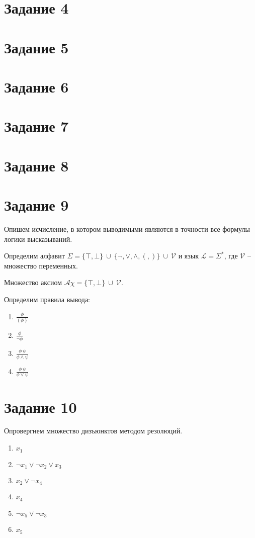 \documentclass{article}
\begin{document}
\section*{Задание 4}

\section*{Задание 5}

\section*{Задание 6}

\section*{Задание 7}

\section*{Задание 8}

\section*{Задание 9}
Опишем исчисление, в котором выводимыми являются в точности все формулы логики
высказываний.

Определим алфавит 
\(\Sigma = \{\top, \bot\}\ \cup\ \{\neg, \lor, \land, (, )\}\ \cup\ \mathcal{V}\)
и язык
\(\mathcal{L} = \Sigma^*\), где \(\mathcal{V}\) -- множество переменных.

Множество аксиом \(\mathcal{A\chi} = \{\top, \bot\}\ \cup\ \mathcal{V}\).

Определим правила вывода:
\begin{enumerate}
    \item \(\frac{\phi}{(\phi)}\)
    \item \(\frac{\phi}{\neg \phi}\)
    \item \(\frac{\phi \ \psi}{\phi \land \psi}\)
    \item \(\frac{\phi \ \psi}{\phi \lor \psi}\)
\end{enumerate}

\section*{Задание 10}
Опровергнем множество дизъюнктов методом резолюций.
\begin{enumerate}
    \item \(x_1\)
    \item \(\neg x_1 \lor \neg x_2 \lor x_3\)
    \item \(x_2 \lor \neg x_4\)
    \item \(x_4\)
    \item \(\neg x_5 \lor \neg x_3\)
    \item \(x_5\)
\end{enumerate}
\end{document}
